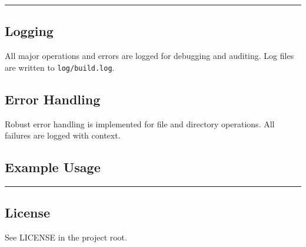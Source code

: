 \begin{center}\rule{0.5\linewidth}{0.5pt}\end{center}

\subsection{Logging}\label{logging}

All major operations and errors are logged for debugging and auditing.
Log files are written to \texttt{log/build.log}.

\subsection{Error Handling}\label{error-handling}

Robust error handling is implemented for file and directory operations.
All failures are logged with context.

\subsection{Example Usage}\label{example-usage}

\begin{Shaded}
\begin{Highlighting}[]
\NormalTok{)}
\NormalTok{)}
\end{Highlighting}
\end{Shaded}

\begin{center}\rule{0.5\linewidth}{0.5pt}\end{center}

\subsection{License}\label{license}

See LICENSE in the project root.
